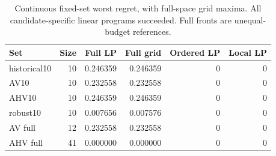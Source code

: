 \begin{table}[tbp]\caption{Continuous fixed-set worst regret, with full-space grid maxima. All candidate-specific linear programs succeeded. Full fronts are unequal-budget references.}\label{tab:audit}\centering
\small
\begin{tabular}{lrrrrr}\toprule
Set & Size & Full LP & Full grid & Ordered LP & Local LP\\\midrule
historical10 & 10 & 0.246359 & 0.246359 & 0 & 0\\
AV10 & 10 & 0.232558 & 0.232558 & 0 & 0\\
AHV10 & 10 & 0.246359 & 0.246359 & 0 & 0\\
robust10 & 10 & 0.007656 & 0.007576 & 0 & 0\\
AV full & 12 & 0.232558 & 0.232558 & 0 & 0\\
AHV full & 41 & 0.000000 & 0.000000 & 0 & 0\\
\bottomrule\end{tabular}

\end{table}
